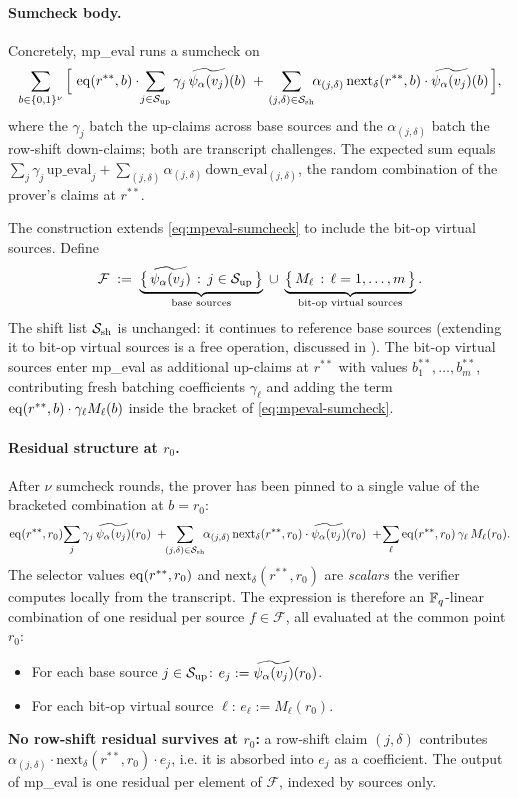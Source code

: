 \paragraph{Sumcheck body.} Concretely, mp\_eval runs a sumcheck on
\begin{equation}
\label{eq:mpeval-sumcheck}
  \sum_{b \in \{0,1\}^{\nu}} \Big[\,
    \operatorname{eq}(r^{**}, b)\cdot \!\sum_{j \in \mathcal{S}_{\mathrm{up}}} \gamma_j\, \widetilde{\psi_{\alpha}(v_j)}(b)
    \;+\;
    \!\sum_{(j,\delta)\in\mathcal{S}_{\mathrm{sh}}}\!\!\alpha_{(j,\delta)}\, \mathrm{next}_\delta(r^{**}, b)\cdot \widetilde{\psi_{\alpha}(v_j)}(b)
  \,\Big],
\end{equation}
where the $\gamma_j$ batch the up-claims across base sources and the
$\alpha_{(j,\delta)}$ batch the row-shift down-claims; both are
transcript challenges. The expected sum equals $\sum_j \gamma_j
\,\text{up\_eval}_j + \sum_{(j,\delta)} \alpha_{(j,\delta)}
\,\text{down\_eval}_{(j,\delta)}$, the random combination of the
prover's claims at $r^{**}$.

The construction extends \cref{eq:mpeval-sumcheck} to include the
bit-op virtual sources. Define
\[
  \mathcal{F} \;:=\;
  \underbrace{\big\{\,\widetilde{\psi_{\alpha}(v_j)} \,:\, j \in \mathcal{S}_{\mathrm{up}}\,\big\}}_{\text{base sources}}
  \;\cup\;
  \underbrace{\big\{\, M_{\ell} \,:\, \ell = 1,\ldots,m\,\big\}}_{\text{bit-op virtual sources}}.
\]
The shift list $\mathcal{S}_{\mathrm{sh}}$ is unchanged: it continues to reference base
sources (extending it to bit-op virtual sources is a free operation,
discussed in ). The bit-op virtual sources
enter mp\_eval as additional up-claims at $r^{**}$ with values
$b_1^{**},\ldots,b_m^{**}$, contributing fresh batching coefficients
$\gamma_\ell$ and adding the term
$\operatorname{eq}(r^{**}, b)\cdot \gamma_\ell M_\ell(b)$ inside the bracket of
\cref{eq:mpeval-sumcheck}.

\paragraph{Residual structure at $r_0$.} After $\nu$ sumcheck rounds,
the prover has been pinned to a single value of the bracketed
combination at $b = r_0$:
\[
  \operatorname{eq}(r^{**}, r_0)\!\sum_j \gamma_j\, \widetilde{\psi_{\alpha}(v_j)}(r_0)
  \;+\!\!\sum_{(j,\delta)\in\mathcal{S}_{\mathrm{sh}}}\!\!\alpha_{(j,\delta)}\, \mathrm{next}_\delta(r^{**}, r_0)\cdot \widetilde{\psi_{\alpha}(v_j)}(r_0)
  \;+\!\sum_{\ell}\operatorname{eq}(r^{**}, r_0)\,\gamma_\ell\, M_\ell(r_0).
\]
The selector values $\operatorname{eq}(r^{**}, r_0)$ and $\mathrm{next}_\delta(r^{**}, r_0)$
are \emph{scalars} the verifier computes locally from the transcript.
The expression is therefore an $\mathbb{F}_q$-linear combination of one
residual per source $f \in \mathcal{F}$, all evaluated at the common
point $r_0$:
\begin{itemize}[leftmargin=2em]
  \item For each base source $j \in \mathcal{S}_{\mathrm{up}}$: $e_j := \widetilde{\psi_{\alpha}(v_j)}(r_0)$.
  \item For each bit-op virtual source $\ell$: $e_{\ell} := M_{\ell}(r_0)$.
\end{itemize}
\textbf{No row-shift residual survives at $r_0$:} a row-shift claim
$(j,\delta)$ contributes $\alpha_{(j,\delta)} \cdot
\mathrm{next}_\delta(r^{**}, r_0) \cdot e_j$, i.e. it is absorbed into
$e_j$ as a coefficient. The output of mp\_eval is one residual per
element of $\mathcal{F}$, indexed by sources only.

